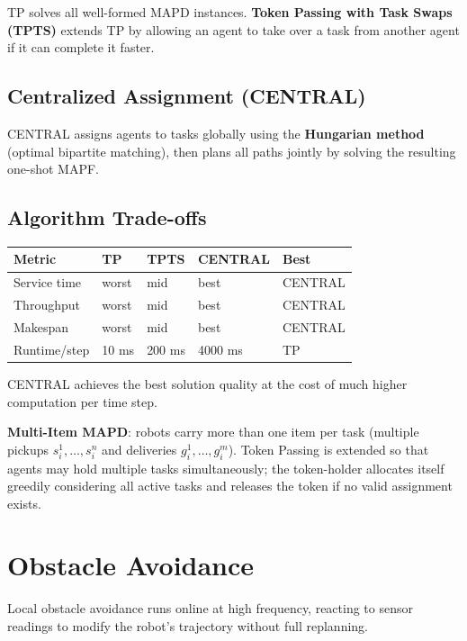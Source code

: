 \documentclass[11pt,a4paper]{article}
\theoremstyle{definition}
\theoremstyle{plain}
\theoremstyle{remark}
\begin{document}
TP solves all well-formed MAPD instances. \textbf{Token Passing with Task Swaps (TPTS)} extends TP by allowing an agent to take over a task from another agent if it can complete it faster.

\subsection{Centralized Assignment (CENTRAL)}

CENTRAL assigns agents to tasks globally using the \textbf{Hungarian method} (optimal bipartite matching), then plans all paths jointly by solving the resulting one-shot MAPF.

\subsection{Algorithm Trade-offs}

\begin{center}
\begin{tabular}{lllll}
\hline
\textbf{Metric} & \textbf{TP} & \textbf{TPTS} & \textbf{CENTRAL} & \textbf{Best} \\
\hline
Service time  & worst & mid  & best & CENTRAL \\
Throughput    & worst & mid  & best & CENTRAL \\
Makespan      & worst & mid  & best & CENTRAL \\
Runtime/step  & 10 ms & 200 ms & 4000 ms & TP \\
\hline
\end{tabular}
\end{center}

CENTRAL achieves the best solution quality at the cost of much higher computation per time step.

\textbf{Multi-Item MAPD}: robots carry more than one item per task (multiple pickups $s^1_i, \ldots, s^n_i$ and deliveries $g^1_i, \ldots, g^m_i$). Token Passing is extended so that agents may hold multiple tasks simultaneously; the token-holder allocates itself greedily considering all active tasks and releases the token if no valid assignment exists.

\section{Obstacle Avoidance}

Local obstacle avoidance runs online at high frequency, reacting to sensor readings to modify the robot's trajectory without full replanning.
\end{document}
